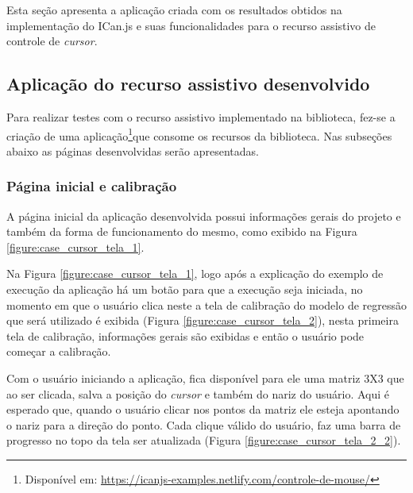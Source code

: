 \par Esta seção apresenta a aplicação criada com os resultados obtidos na implementação do ICan.js e suas funcionalidades para o recurso assistivo de controle de \textit{cursor}.

\subsection{Aplicação do recurso assistivo desenvolvido}

\par Para realizar testes com o recurso assistivo implementado na biblioteca, fez-se a criação de uma aplicação\footnote{Disponível em: \url{https://icanjs-examples.netlify.com/controle-de-mouse/}}que consome os recursos da biblioteca. Nas subseções abaixo as páginas desenvolvidas serão apresentadas.

\subsubsection{Página inicial e calibração}

\par A página inicial da aplicação desenvolvida possui informações gerais do projeto e também da forma de funcionamento do mesmo, como exibido na Figura \ref{figure:case_cursor_tela_1}.


\par Na Figura \ref{figure:case_cursor_tela_1}, logo após a explicação do exemplo de execução da aplicação há um botão para que a execução seja iniciada, no momento em que o usuário clica neste a tela de calibração do modelo de regressão que será utilizado é exibida (Figura \ref{figure:case_cursor_tela_2}), nesta primeira tela de calibração, informações gerais são exibidas e então o usuário pode começar a calibração.


\par Com o usuário iniciando a aplicação, fica disponível para ele uma matriz 3X3 que ao ser clicada, salva a posição do \textit{cursor} e também do nariz do usuário. Aqui é esperado que, quando o usuário clicar nos pontos da matriz ele esteja apontando o nariz para a direção do ponto. Cada clique válido do usuário, faz uma barra de progresso no topo da tela ser atualizada (Figura \ref{figure:case_cursor_tela_2_2}).

